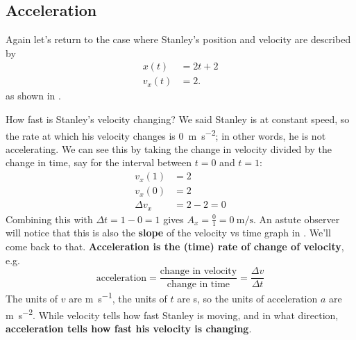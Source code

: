 \documentclass{tufte-handout}
\begin{document}
\subsection{Acceleration}
Again let's return to the case where Stanley's position and velocity are described by
\begin{align}
x(t) &= 2 t + 2 \\
v_x(t) &= 2. 
\end{align}
as shown in .
\begin{marginfigure}
\caption{Stanley's position, velocity, and acceleration}
\label{fig:acceleration1}
\end{marginfigure}
How fast is Stanley's velocity changing? We said Stanley is at constant speed, so the rate at which his velocity changes is \SI{0}{\meter\per\second\squared}; in other words, he is not accelerating. We can see this by taking the change in velocity divided by the change in time, say for the interval between $t=0$ and $t=1$:
\begin{align}
v_x(1) &= 2 \\
v_x(0) &= 2 \\
\Delta v_x &= 2 - 2 = 0
\end{align}
Combining this with $\Delta t = 1-0 = 1$ gives $A_x=\frac{0}{1}=\SI{0}{\meter\per\second}$. An astute observer will notice that this is also the \textbf{slope} of the velocity vs time graph in . We'll come back to that.  \textbf{Acceleration is the (time) rate of change of velocity}, e.g.
\begin{equation}
\text{acceleration} = \dfrac{\text{change in velocity}}{\text{change in time}} = \dfrac{\Delta v}{\Delta t}
\end{equation}
The units of $v$ are \si{\meter\per\second}, the units of $t$ are \si{\second}, so the units of acceleration $a$ are \si{\meter\per\second\squared}. While velocity tells how fast Stanley is moving, and in what direction, \textbf{acceleration tells how fast his velocity is changing}. 
\end{document}
